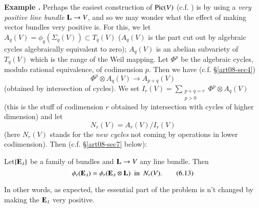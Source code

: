 \medskip
\noindent
{\bf Example .\label{art08-sec6-exam4}}
Perhaps the easiest construction of $\operatorname{\mathrm{Pic}}(V)$ (c.f. \cite{art08-key18}) is by using a {\em very positive line bundle} $\mathbf{L}\to V$, and so we may wonder what the effect of making vector bundles very positive is. For this, we let $A_{q}(V)=\phi_{q}(\Sigma_{q}(V))\subset T_{q}(V)$ ($A_{q}(V)$ is the part cut out by algebraic cycles algebraically equivalent to zero); $A_{q}(V)$ is an abelian subvariety of $T_{q}(V)$ which is the range of the Weil mapping. Let $\Phi^{p}$ be the algebraic cycles, modulo rational equivalence, of codimension $p$. Then we have (c.f. \S\ref{art08-sec4})
\begin{equation*}
\Phi^{p}\otimes A_{q}(V)\to A_{p+q}(V)\tag{6.11}\label{art08-sec6-eq6.11}
\end{equation*}
(obtained by intersection of cycles). We set $I_{r}(V)=\sum\limits_{\substack{p+q=r\\ p>0}}\Phi^{p}\otimes A_{q}(V)$ (this is the stuff of codimension $r$ obtained by intersection with cycles of higher dimension) and let
\begin{equation*}
N_{r}(V)=A_{r}(V)/I_{r}(V)\tag{6.12}\label{art08-sec6-eq6.12}
\end{equation*}
(here $N_{r}(V)$ stands for the {\em new cycles} not coming by operations in lower codimension). Then (c.f. \S\ref{art08-sec7} below):

Let\pageoriginale $\{\mathbf{E}_{\lambda}\}$ be a family of bundles and $\mathbf{L}\to V$ any line bundle. Then 
\begin{equation*}
\phi_{r}(\mathbf{E}_{\lambda})=\phi_{r}(\mathbf{E}_{\lambda}\otimes \mathbf{L})\text{~ in~ } N_{r}(V).\tag{6.13}\label{art08-sec6-eq6.13}
\end{equation*}

In other words, as expected, the essential part of the problem is n't changed by making the $\mathbf{E}_{\lambda}$ very positive.

